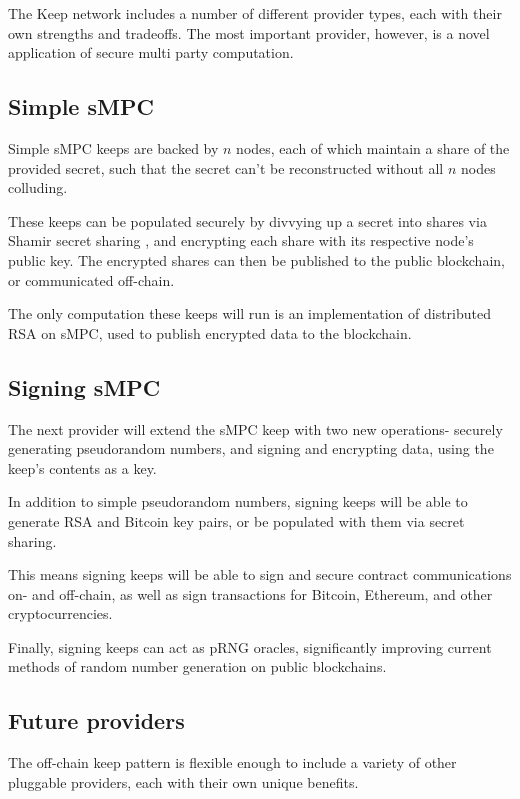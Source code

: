 \documentclass[11pt]{article}
\begin{document}
The Keep network includes a number of different provider types, each
with their own strengths and tradeoffs. The most important provider,
however, is a novel application of secure multi party computation.

\subsection{Simple sMPC}

Simple sMPC keeps are backed by $n$ nodes, each of which maintain a
share of the provided secret, such that the secret can't be
reconstructed without all $n$ nodes colluding.

These keeps can be populated securely by divvying up a secret into
shares via Shamir secret sharing \cite{shamir}, and encrypting each
share with its respective node's public key. The encrypted shares can
then be published to the public blockchain, or communicated off-chain.

The only computation these keeps will run is an implementation of
distributed RSA \cite{mauland2009realizing} on sMPC, used to publish
encrypted data to the blockchain.

\subsection{Signing sMPC}

The next provider will extend the sMPC keep with two new operations-
securely generating pseudorandom numbers, and signing and encrypting
data, using the keep's contents as a key.

In addition to simple pseudorandom numbers, signing keeps will be able
to generate RSA \cite{mauland2009realizing} and Bitcoin
\cite{gennaro2016threshold,coinparty} key pairs, or be populated with
them via secret sharing.

This means signing keeps will be able to sign and secure contract
communications on- and off-chain, as well as sign transactions for
Bitcoin, Ethereum, and other cryptocurrencies.

Finally, signing keeps can act as pRNG oracles, significantly
improving current methods of random number generation on public
blockchains.

\subsection{Future providers}

The off-chain keep pattern is flexible enough to include a variety of
other pluggable providers, each with their own unique benefits.
\end{document}
